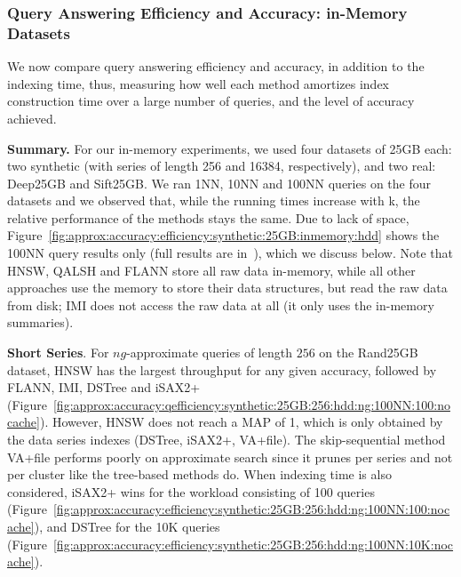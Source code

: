 {{\subsubsection{\textbf{Query Answering Efficiency and Accuracy: in-Memory Datasets}}
\label{ssec:query_efficiency_mem}

{\color{black}
	We now compare query answering efficiency and accuracy, in addition to the indexing time, thus, measuring how well each method amortizes index construction time over a large number of queries, and the level of accuracy achieved.
}

\noindent\textbf{Summary.} 
For our in-memory experiments, we used four datasets of 25GB each: two synthetic (with series of length 256 and 16384, respectively), and two real: Deep25GB and Sift25GB. 
We ran 1NN, 10NN and {\color{black} 100NN} queries on the four datasets and we observed that, while the running times increase with k, the relative performance of the methods stays the same. 
Due to lack of space, Figure~\ref{fig:approx:accuracy:efficiency:synthetic:25GB:inmemory:hdd} shows the 100NN query results only (full results are in~\cite{url/DSSeval2}), which we discuss below. 
{\color{black} Note that  HNSW, QALSH and FLANN store all raw data in-memory, %
while all other approaches use the memory to store their data structures, but read the raw data from disk; IMI does not access the raw data at all (it only uses the in-memory summaries).}

\noindent\textbf{Short Series}. 
For $ng$-approximate queries of length $256$ on the Rand25GB dataset, HNSW has the largest throughput for any given accuracy, followed by {\color{black}FLANN}, IMI, DSTree and iSAX2+ (Figure~\ref{fig:approx:accuracy:qefficiency:synthetic:25GB:256:hdd:ng:100NN:100:nocache}). 
However, HNSW does not reach a MAP of 1, which is only obtained by the data series indexes (DSTree, iSAX2+, VA+file). The skip-sequential method VA+file performs poorly on approximate search since it prunes per series and not per cluster like the tree-based methods do. 
When indexing time is also considered, iSAX2+ wins for the workload consisting of 100 queries (Figure~\ref{fig:approx:accuracy:efficiency:synthetic:25GB:256:hdd:ng:100NN:100:nocache}), and DSTree for the 10K queries (Figure~\ref{fig:approx:accuracy:efficiency:synthetic:25GB:256:hdd:ng:100NN:10K:nocache}). 

}}
